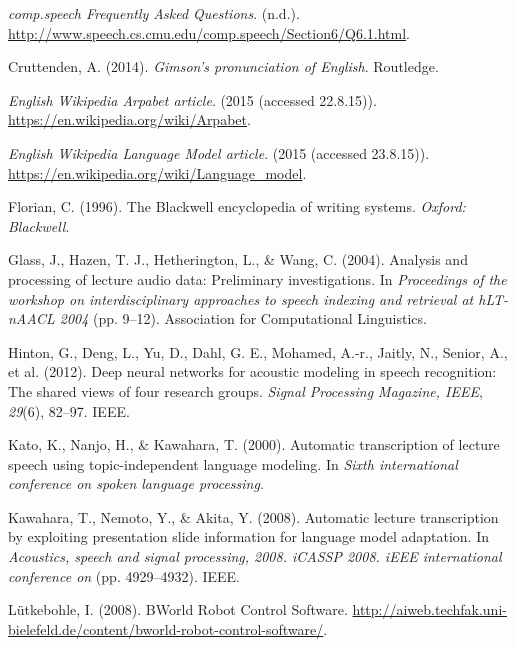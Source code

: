 \documentclass[]{article}
\begin{document}
\emph{comp.speech Frequently Asked Questions}. (n.d.).
\url{http://www.speech.cs.cmu.edu/comp.speech/Section6/Q6.1.html}.

Cruttenden, A. (2014). \emph{Gimson's pronunciation of English}.
Routledge.

\emph{English Wikipedia Arpabet article}. (2015 (accessed 22.8.15)).
\url{https://en.wikipedia.org/wiki/Arpabet}.

\emph{English Wikipedia Language Model article}. (2015 (accessed
23.8.15)). \url{https://en.wikipedia.org/wiki/Language_model}.

Florian, C. (1996). The Blackwell encyclopedia of writing systems.
\emph{Oxford: Blackwell}.

Glass, J., Hazen, T. J., Hetherington, L., \& Wang, C. (2004). Analysis
and processing of lecture audio data: Preliminary investigations. In
\emph{Proceedings of the workshop on interdisciplinary approaches to
speech indexing and retrieval at hLT-nAACL 2004} (pp. 9--12).
Association for Computational Linguistics.

Hinton, G., Deng, L., Yu, D., Dahl, G. E., Mohamed, A.-r., Jaitly, N.,
Senior, A., et al. (2012). Deep neural networks for acoustic modeling in
speech recognition: The shared views of four research groups.
\emph{Signal Processing Magazine, IEEE}, \emph{29}(6), 82--97. IEEE.

Kato, K., Nanjo, H., \& Kawahara, T. (2000). Automatic transcription of
lecture speech using topic-independent language modeling. In \emph{Sixth
international conference on spoken language processing}.

Kawahara, T., Nemoto, Y., \& Akita, Y. (2008). Automatic lecture
transcription by exploiting presentation slide information for language
model adaptation. In \emph{Acoustics, speech and signal processing,
2008. iCASSP 2008. iEEE international conference on} (pp. 4929--4932).
IEEE.

Lütkebohle, I. (2008). BWorld Robot Control Software.
\url{http://aiweb.techfak.uni-bielefeld.de/content/bworld-robot-control-software/}.
\end{document}
